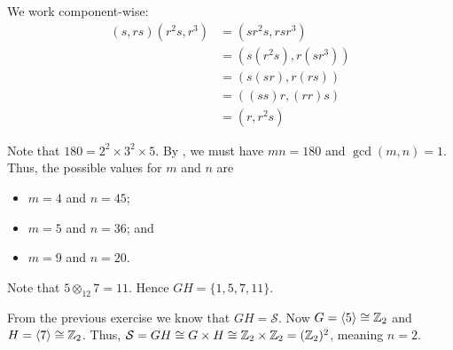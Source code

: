 \begin{questions}
    \item We work component-wise:
    \begin{align*}
        (s, rs)(r^2s, r^3) &= (sr^2s, rsr^3)\\
        &= (s(r^2s), r(sr^3))\\
        &= (s(sr), r(rs))\\
        &= ((ss)r, (rr)s)\\
        &= (r, r^2s)
    \end{align*}

    \item Note that $180 = 2^2 \times 3^2 \times 5$. By , we must have $mn = 180$ and $\gcd(m, n) = 1$. Thus, the possible values for $m$ and $n$ are
    \begin{itemize}
        \item $m = 4$ and $n = 45$;
        \item $m = 5$ and $n = 36$; and
        \item $m = 9$ and $n = 20$.
    \end{itemize}

    \item Note that $5 \otimes_{12} 7 = 11$. Hence $GH = \{1, 5, 7, 11\}$.

    \item From the previous exercise we know that $GH = \mathcal{S}$. Now $G = \langle 5 \rangle \cong \mathbb{Z}_2$ and $H = \langle 7 \rangle \cong \mathbb{Z}_2$. Thus, $\mathcal{S} = GH \cong G \times H \cong \mathbb{Z}_2 \times \mathbb{Z}_2 = (\mathbb{Z}_2)^2$, meaning $n = 2$.
\end{questions}

